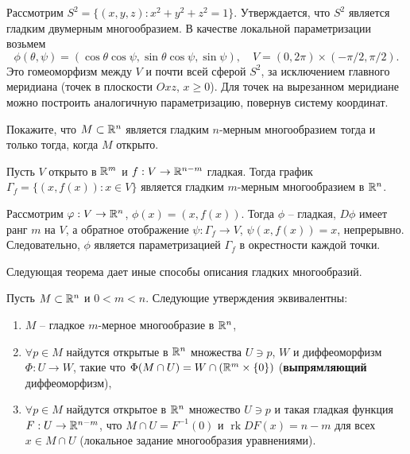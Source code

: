 \begin{example}
	Рассмотрим $S^2 = \{(x, y, z) : x^2+y^2+z^2 = 1\}$. Утверждается, что $S^2$ является гладким двумерным многообразием.
	В качестве локальной параметризации возьмем 
	\[ \phi(\theta, \psi) = (\cos \theta \cos \psi, \sin \theta \cos \psi, \sin \psi), \quad V = (0, 2\pi) \times (-\pi/2, \pi/2). \]
	Это гомеоморфизм между $V$ и почти всей сферой $S^2$, за исключением главного меридиана (точек в плоскости $Oxz$, $x \ge 0$). 
	Для точек на вырезанном меридиане можно построить аналогичную параметризацию, повернув систему координат. 
\end{example}

\begin{problem}
	Покажите, что $M \subset \mathbb{R}^n$ является гладким $n$-мерным многообразием тогда и только тогда, когда $M$ открыто.
\end{problem}

\begin{example}
	Пусть $V$ открыто в $\mathbb{R}^m$ и $f : V \to \mathbb{R}^{n-m}$ гладкая. Тогда график $\Gamma_f = \{(x, f(x)) : x \in V\}$ является гладким $m$-мерным многообразием в $\mathbb{R}^n$. 
\end{example}

\begin{myproof}
	Рассмотрим $\varphi : V \to \mathbb{R}^n$, $\phi(x) = (x, f(x))$. Тогда $\phi$ -- гладкая, $D \phi$ имеет ранг $m$ на $V$, а обратное отображение $\psi : \Gamma_f \to V$, $\psi(x, f(x)) = x$, непрерывно. 
	Следовательно, $\phi$ является параметризацией $\Gamma_f$ в окрестности каждой точки.
\end{myproof}

\vspace{5pt}
Следующая теорема дает иные способы описания гладких многообразий.

\begin{theorem}
	Пусть $M \subset \mathbb{R}^n$ и $0 < m < n$. Следующие утверждения эквивалентны: 
	\begin{enumerate}[itemsep = 0pt, topsep = 5pt]
		\item $M$ -- гладкое $m$-мерное многообразие в $\mathbb{R}^n$, 
		\item $\forall p \in M$ найдутся открытые в $\mathbb{R}^n$ множества $U \ni p$, $W$ и диффеоморфизм $\Phi : U \to W$, такие что $\Phi(M \cap U) = W \cap (\mathbb{R}^m \times \{0\})$ (\textbf{выпрямляющий} диффеоморфизм),
		\item $\forall p \in M$ найдутся открытое в $\mathbb{R}^n$ множество $U \ni p$ и такая гладкая функция $F : U \to \mathbb{R}^{n-m}$, что $M \cap U = F^{-1}(0)$ и $\operatorname{rk} DF(x) = n-m$ для всех $x \in M \cap U$
		(локальное задание многообразия уравнениями).
	\end{enumerate}
\end{theorem}

